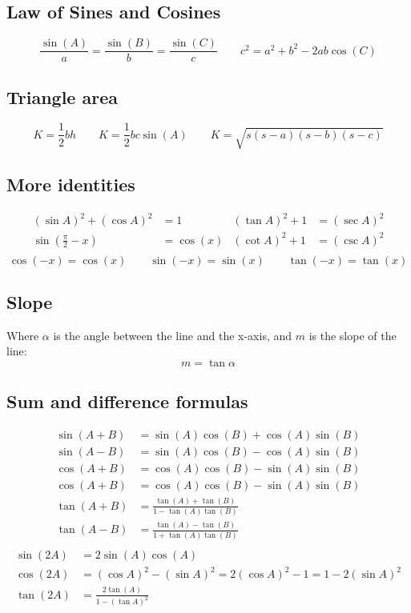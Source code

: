 \subsection{Law of Sines and Cosines}
\[
	\frac{\sin(A)}{a} = \frac{\sin(B)}{b} = \frac{\sin(C)}{c} \qquad
	c^2 = a^2 + b^2 - 2ab\cos(C)
\]
\subsection{Triangle area}
\[
	K = \frac{1}{2}bh \qquad
	K = \frac{1}{2}bc \sin(A) \qquad
	K = \sqrt{s(s-a)(s-b)(s-c)}
\]
\subsection{More identities}
\[\begin{aligned}
	(\sin A)^2 + (\cos A)^2 &= 1 &
	(\tan A)^2 + 1 &= (\sec A)^2 \\
	\sin(\frac{\pi}{2} - x) &= \cos(x) &
	(\cot A)^2 + 1 &= (\csc A)^2 \\
\end{aligned}\]\[
	\cos(-x) = \cos(x) \qquad
	\sin(-x) = \sin(x) \qquad
	\tan(-x) = \tan(x)
\]
\subsection{Slope}
Where $\alpha$ is the angle between the line and the x-axis, and $m$ is the slope of the line:
\[
	m = \tan \alpha
\]
\subsection{Sum and difference formulas}
\[\begin{aligned}
	\sin(A + B) &= \sin(A)\cos(B) + \cos(A)\sin(B) \\
	\sin(A - B) &= \sin(A)\cos(B) - \cos(A)\sin(B) \\
	\cos(A + B) &= \cos(A)\cos(B) - \sin(A)\sin(B) \\
	\cos(A + B) &= \cos(A)\cos(B) - \sin(A)\sin(B) \\
	\tan(A + B) &= \frac{\tan(A) + \tan(B)}{1-\tan(A)\tan(B)} \\
	\tan(A - B) &= \frac{\tan(A) - \tan(B)}{1+\tan(A)\tan(B)} \\
\end{aligned}\]\[\begin{aligned}
	\sin(2A) &= 2\sin(A)\cos(A) \\
	\cos(2A) &= (\cos A)^2 - (\sin A)^2 = 2(\cos A)^2 - 1 = 1 - 2(\sin A)^2 \\
	\tan(2A) &= \frac{2\tan(A)}{1 - (\tan A)^2}
\end{aligned}\]

